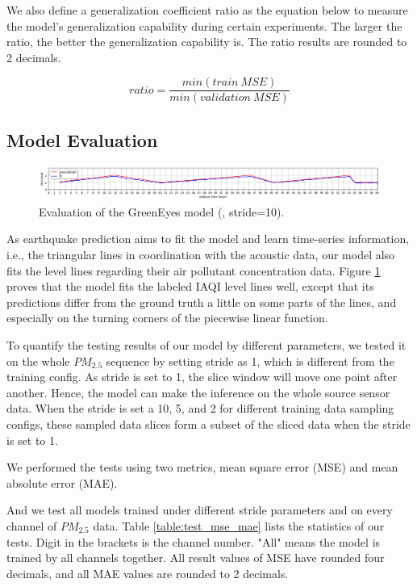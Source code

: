 We also define a generalization coefficient ratio as the equation below to measure the model's generalization capability during certain experiments. The larger the ratio,  the better the generalization capability is. The ratio results are rounded to 2 decimals.

\begin{equation}
    ratio=\frac{min(train\ MSE)}{min(validation\ MSE)}
\end{equation}

\subsection{Model Evaluation}

\begin{figure}
    \centering
    \includegraphics[width=\linewidth]{fig/model_eval_pm25_0_stride_10.png}
    \caption{Evaluation of the GreenEyes model (, stride=10).}
    \label{fig:model_eval_pm25_0_stride_10}
\end{figure}

As earthquake prediction aims to fit the model and learn time-series information, i.e., the triangular lines in coordination with the acoustic data, our model also fits the level lines regarding their air pollutant concentration data. Figure \ref{fig:model_eval_pm25_0_stride_10} proves that the model fits the labeled IAQI level lines well, except that its predictions differ from the ground truth a little on some parts of the lines, and especially on the turning corners of the piecewise linear function.

To quantify the testing results of our model by different parameters, we tested it on the whole $PM_{2.5}$ sequence by setting stride as 1, which is different from the training config. As stride is set to 1, the slice window will move one point after another. Hence, the model can make the inference on the whole source sensor data. When the stride is set a 10, 5, and 2 for different training data sampling configs, these sampled data slices form a subset of the sliced data when the stride is set to 1.

We performed the tests using two metrics, mean square error (MSE) and mean absolute error (MAE).

And we test all models trained under different stride parameters and on every channel of $PM_{2.5}$ data. Table \ref{table:test_mse_mae} lists the statistics of our tests. Digit in the brackets is the channel number. "All" means the model is trained by all channels together. All result values of MSE have rounded four decimals, and all MAE values are rounded to 2 decimals.

